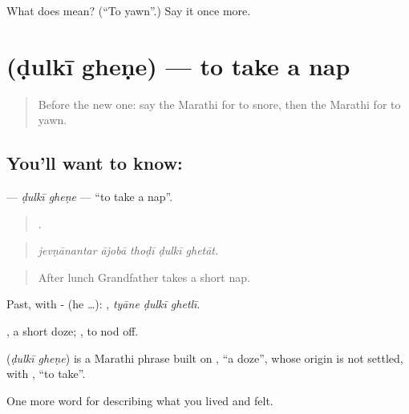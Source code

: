\begin{tcolorbox}[breakable,colback=teal!4,colframe=teal!35!black,title={Before you move on}]
What does   mean? (\textquotedblleft{}To yawn\textquotedblright{}.) Say it once more.
\end{tcolorbox}
\section[\texorpdfstring{\mr{डुलकी} \mr{घेणे} (ḍulkī gheṇe)}{डुलकी घेणे (ḍulkī gheṇe)}]{  (ḍulkī gheṇe) — to take a nap}

\label{lesson:MR-C491-dulki-ghene}



\begin{quote}
Before the new one: say the Marathi for to snore, then the Marathi for to yawn.
\end{quote}

\subsection*{You'll want to know:  }
\textbf{ } — \emph{ḍulkī gheṇe} — \textquotedblleft{}to take a nap\textquotedblright{}.

\begin{quote}
    .
\end{quote}

\begin{quote}
\emph{jevṇānantar ājobā thoḍī ḍulkī ghetāt.}
\end{quote}

\begin{quote}
After lunch Grandfather takes a short nap.
\end{quote}

Past, with - (he …):   , \emph{tyāne ḍulkī ghetlī}.

, a short doze;  , to nod off.

\begin{cousinweb}
\textbf{ } (\emph{ḍulkī gheṇe}) is a Marathi phrase built on , \textquotedblleft{}a doze\textquotedblright{}, whose origin is not settled, with , \textquotedblleft{}to take\textquotedblright{}.
\end{cousinweb}

\begin{grammarlens}[title={What you've built}]
One more word for describing what you lived and felt.
\end{grammarlens}

